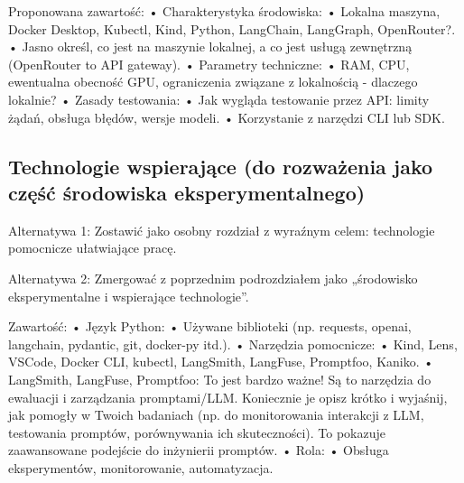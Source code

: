 Proponowana zawartość:
	•	Charakterystyka środowiska:
	•	    Lokalna maszyna, Docker Desktop, Kubectl, Kind, Python, LangChain, LangGraph, OpenRouter?.
	•		Jasno określ, co jest na maszynie lokalnej, a co jest usługą zewnętrzną (OpenRouter to API gateway).
	•	Parametry techniczne:
	•	    RAM, CPU, ewentualna obecność GPU, ograniczenia związane z lokalnością - dlaczego lokalnie?
	•	Zasady testowania:
	•	    Jak wygląda testowanie przez API: limity żądań, obsługa błędów, wersje modeli.
	•	    Korzystanie z narzędzi CLI lub SDK.



\subsection{Technologie wspierające (do rozważenia jako część środowiska eksperymentalnego)}

Alternatywa 1: Zostawić jako osobny rozdział z wyraźnym celem: technologie pomocnicze ułatwiające pracę.

Alternatywa 2: Zmergować z poprzednim podrozdziałem jako „środowisko eksperymentalne i wspierające technologie”.

Zawartość:
	•	Język Python:
	•	    Używane biblioteki (np. requests, openai, langchain, pydantic, git, docker-py itd.).
	•	Narzędzia pomocnicze:
	•	    Kind, Lens, VSCode, Docker CLI, kubectl, LangSmith, LangFuse, Promptfoo, Kaniko.
	•		LangSmith, LangFuse, Promptfoo: To jest bardzo ważne! Są to narzędzia do ewaluacji i zarządzania promptami/LLM. Koniecznie je opisz krótko i wyjaśnij, jak pomogły w Twoich badaniach (np. do monitorowania interakcji z LLM, testowania promptów, porównywania ich skuteczności). To pokazuje zaawansowane podejście do inżynierii promptów.
	•	Rola:
	•	    Obsługa eksperymentów, monitorowanie, automatyzacja.


